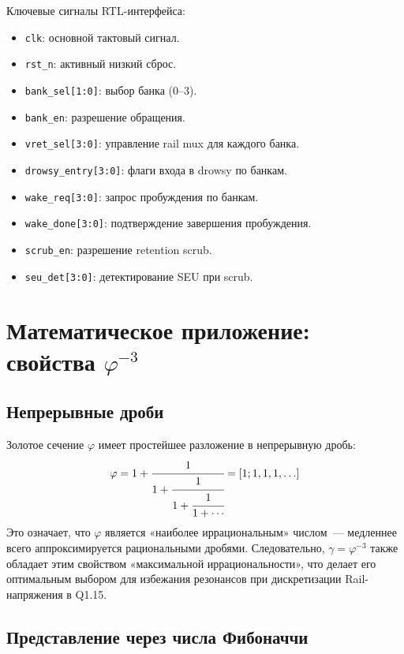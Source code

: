 Ключевые сигналы RTL-интерфейса:
%
\begin{itemize}
  \item \texttt{clk}: основной тактовый сигнал.
  \item \texttt{rst\_n}: активный низкий сброс.
  \item \texttt{bank\_sel[1:0]}: выбор банка (0--3).
  \item \texttt{bank\_en}: разрешение обращения.
  \item \texttt{vret\_sel[3:0]}: управление rail mux для каждого банка.
  \item \texttt{drowsy\_entry[3:0]}: флаги входа в drowsy по банкам.
  \item \texttt{wake\_req[3:0]}: запрос пробуждения по банкам.
  \item \texttt{wake\_done[3:0]}: подтверждение завершения пробуждения.
  \item \texttt{scrub\_en}: разрешение retention scrub.
  \item \texttt{seu\_det[3:0]}: детектирование SEU при scrub.
\end{itemize}

\section{Математическое приложение: свойства $\varphi^{-3}$}
\label{sec:glava89-math-appendix}

\subsection{Непрерывные дроби}

Золотое сечение $\varphi$ имеет простейшее разложение
в непрерывную дробь:
\[
  \varphi = 1 + \cfrac{1}{1 + \cfrac{1}{1 + \cfrac{1}{1 + \cdots}}} = [1; 1, 1, 1, \ldots]
\]
Это означает, что $\varphi$ является «наиболее иррациональным» числом~---
медленнее всего аппроксимируется рациональными дробями.
Следовательно, $\gamma = \varphi^{-3}$ также обладает этим свойством
«максимальной иррациональности», что делает его
оптимальным выбором для избежания резонансов
при дискретизации Rail-напряжения в Q1.15.

\subsection{Представление через числа Фибоначчи}

